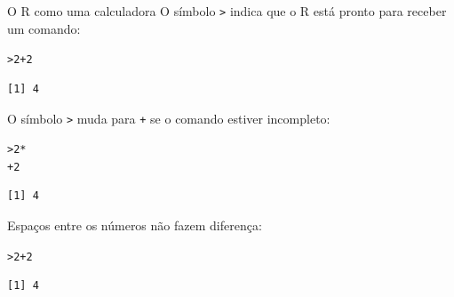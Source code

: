 \documentclass[10pt,handout]{beamer}\usepackage[]{graphicx}\usepackage[]{color}
\makeatletter
\newcommand{\hlnum}[1]{\textcolor[rgb]{0.686,0.059,0.569}{#1}}%
\newcommand{\hlopt}[1]{\textcolor[rgb]{0,0,0}{#1}}%
\newcommand{\hlstd}[1]{\textcolor[rgb]{0.345,0.345,0.345}{#1}}%
\newenvironment{kframe}{%
 \def\at@end@of@kframe{}%
 \ifinner\ifhmode%
  \def\at@end@of@kframe{\end{minipage}}%
  \begin{minipage}{\columnwidth}%
 \fi\fi%
 \def\FrameCommand##1{\hskip\@totalleftmargin \hskip-\fboxsep
 \colorbox{shadecolor}{##1}\hskip-\fboxsep
     \hskip-\linewidth \hskip-\@totalleftmargin \hskip\columnwidth}%
 \MakeFramed {\advance\hsize-\width
   \@totalleftmargin\z@ \linewidth\hsize
   \@setminipage}}%
 {\par\unskip\endMakeFramed%
 \at@end@of@kframe}
\newenvironment{knitrout}{}{} %
\makeatother
\begin{document}
\begin{frame}[fragile]{O R como uma calculadora}
O símbolo \verb|>| indica que o R está pronto para receber um comando:
\begin{knitrout}\small
{}\color{fgcolor}\begin{kframe}
\begin{alltt}
\hlstd{> }\hlnum{2} \hlopt{+} \hlnum{2}
\end{alltt}
\begin{verbatim}
[1] 4
\end{verbatim}
\end{kframe}
\end{knitrout}
O símbolo \verb|>| muda para \verb|+| se o comando estiver incompleto:
\begin{knitrout}\small
{}\color{fgcolor}\begin{kframe}
\begin{alltt}
\hlstd{> }\hlnum{2} \hlopt{*}
\hlstd{+ }\hlnum{2}
\end{alltt}
\begin{verbatim}
[1] 4
\end{verbatim}
\end{kframe}
\end{knitrout}
Espaços entre os números não fazem diferença:
\begin{knitrout}\small
{}\color{fgcolor}\begin{kframe}
\begin{alltt}
\hlstd{> }\hlnum{2}\hlopt{+}         \hlnum{2}
\end{alltt}
\begin{verbatim}
[1] 4
\end{verbatim}
\end{kframe}
\end{knitrout}
\end{frame}
\end{document}
